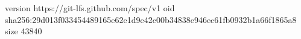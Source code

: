version https://git-lfs.github.com/spec/v1
oid sha256:29d013f033454489165e62e1d9e42c00b34838e946ec61fb0932b1a66f1865a8
size 43840
